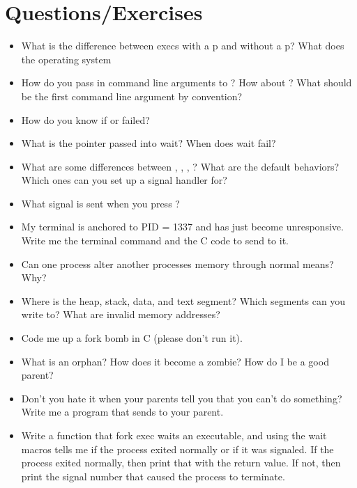 \section{Questions/Exercises}

\begin{itemize}
\item
  What is the difference between execs with a p and without a p? What does the operating system
\item
  How do you pass in command line arguments to ? How about ? What should be the first command line argument by convention?
\item
  How do you know if  or  failed?
\item
  What is the  pointer passed into wait? When does wait fail?
\item
  What are some differences between , , , ? What are the default behaviors? Which ones can you set up a signal handler for?
\item
  What signal is sent when you press ?
\item
  My terminal is anchored to PID = 1337 and has just become unresponsive. Write me the terminal command and the C code to send  to it.
\item
  Can one process alter another processes memory through normal means? Why?
\item
  Where is the heap, stack, data, and text segment? Which segments can you write to? What are invalid memory addresses?
\item
  Code me up a fork bomb in C (please don't run it).
\item
  What is an orphan? How does it become a zombie? How do I be a good parent?
\item
  Don't you hate it when your parents tell you that you can't do something? Write me a program that sends  to your parent.
\item
  Write a function that fork exec waits an executable, and using the wait macros tells me if the process exited normally or if it was signaled. If the process exited normally, then print that with the return value. If not, then print the signal number that caused the process to terminate.
\end{itemize}



